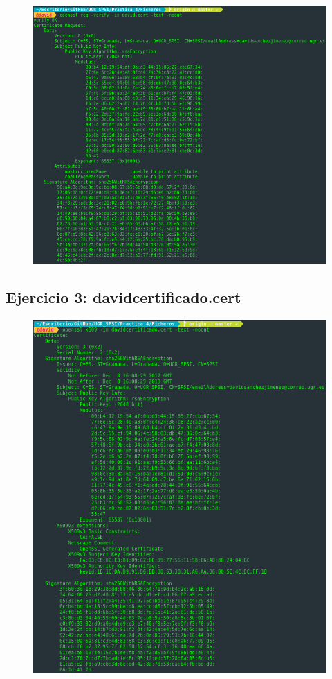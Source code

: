 \documentclass[10pt,a4paper,spanish]{report}
\begin{document}
\begin{figure}[!hbp]
 \centering  \includegraphics[width=1\textwidth]{./Imagenes/6_2.png}
\end{figure}

\newpage
\subsection*{Ejercicio 3: davidcertificado.cert}

\begin{figure}[!hbp]
 \centering  \includegraphics[width=1\textwidth]{./Imagenes/6_3.png}
\end{figure}
\end{document}
